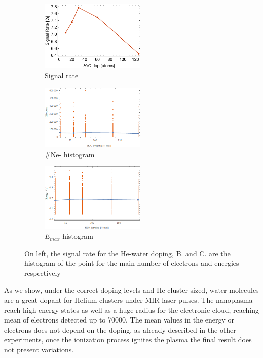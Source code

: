 \begin{figure}[ht]%
    \begin{subfigure}{0.3\textwidth}
\includegraphics[width=5cm]{../Images/results/MIR_He_waterDop/results/MIR_HE_water_Signalrate.pdf}     \caption{Signal rate}
        \label{fig:HeArhistograms-electr}
    \end{subfigure}
\hfill%
   \begin{subfigure}{0.3\textwidth}
\includegraphics[width=5cm]{../Images/results/MIR_He_waterDop/results/Nelc_dopp.png}    
    \caption{$\#$Ne- histogram}
        \label{fig:HeArhistograms-electr}
    \end{subfigure}
\hfill%
    \begin{subfigure}{0.3\textwidth}
\includegraphics[width=5cm]{../Images/results/MIR_He_waterDop/results/Kener_Dopp.png}     \caption{$E_{max}$ histogram}
    \label{fig:HeArhistograms-energ}
\end{subfigure}
\hfill%
     \caption[MIR He-water doping, signal rate and histograms]{On left, the signal rate for the He-water doping, B. and C. are the histogram of the point for the main  number of electrons and energies respectively}
    \label{fig:Hewaterhistograms}
\end{figure}

As we show, under the correct doping levels and He cluster sized, water molecules are a great dopant for Helium clusters under MIR laser pulses. The nanoplasma reach high energy states as well as a huge radius for the electronic cloud, reaching mean of electrons detected up to 70000. The mean values in the energy or electrons does not depend on the doping, as already described in the other experiments, once the ionization process ignites the plasma  the final result does not present variations.



